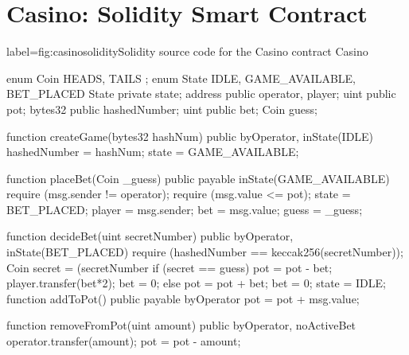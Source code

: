\documentclass[a4paper,UKenglish,cleveref, autoref, thm-restate]{oasics-v2021}
\begin{document}
%


\appendix

\section{Casino: Solidity Smart Contract}\label{sec:app1}


\begin{code}{label={fig:casino}}{solidity}{Solidity source code for the Casino}
	contract Casino {
		enum Coin { HEADS, TAILS } ;
		enum State { IDLE, GAME_AVAILABLE,  BET_PLACED }
		State private state; 
		address public operator, player;
		uint public pot;
		bytes32 public hashedNumber;
		uint public bet;
		Coin guess;

		function createGame(bytes32 hashNum) 
			public byOperator, inState(IDLE) { 
			hashedNumber = hashNum; 
			state = GAME_AVAILABLE;
		}

		function placeBet(Coin _guess) public payable inState(GAME_AVAILABLE) {
			require (msg.sender != operator);
			require (msg.value <= pot);
			state = BET_PLACED; 
			player = msg.sender; 
			bet = msg.value; 
			guess = _guess; 
		}

 		function decideBet(uint secretNumber) 
		public byOperator, inState(BET_PLACED) { 
			require (hashedNumber == keccak256(secretNumber)); 
			Coin secret = (secretNumber %
			if (secret == guess) {
				pot = pot - bet;  
				player.transfer(bet*2);  
				bet = 0;} 
			else {
				pot = pot + bet; 
				bet = 0;
				}
			state = IDLE;}
		function addToPot() public payable byOperator { pot = pot + msg.value;}

		function removeFromPot(uint amount) public byOperator, noActiveBet { 
			operator.transfer(amount);  
			pot = pot - amount;}
		}
\end{code}
\end{document}
